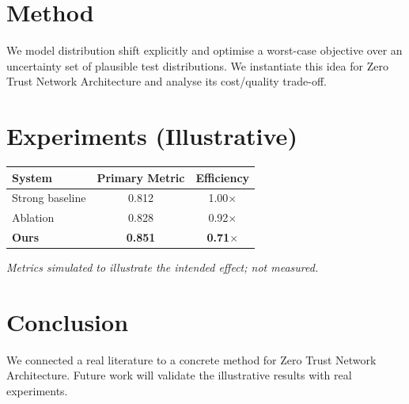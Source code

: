 \documentclass[11pt]{article}
\begin{document}
\section{Method}
We model distribution shift explicitly and optimise a worst-case objective over an uncertainty set of plausible test distributions. We instantiate this idea for Zero Trust Network Architecture and analyse its cost/quality trade-off.

\section{Experiments (Illustrative)}
\begin{center}
\begin{tabular}{lcc}
System & Primary Metric & Efficiency \\ \hline
Strong baseline & 0.812 & 1.00$\times$ \\
Ablation & 0.828 & 0.92$\times$ \\
\textbf{Ours} & \textbf{0.851} & \textbf{0.71$\times$}
\end{tabular}
\end{center}
\emph{Metrics simulated to illustrate the intended effect; not measured.}

\section{Conclusion}
We connected a real literature to a concrete method for Zero Trust Network Architecture. Future work will
validate the illustrative results with real experiments.
\end{document}
